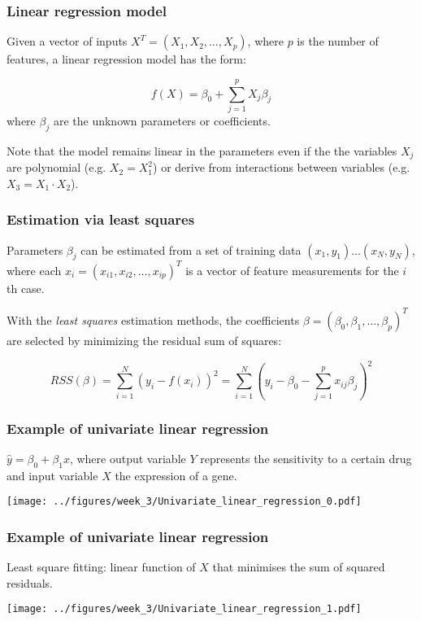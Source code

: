 \documentclass[notes]{beamer}          %
\begin{document}
\begin{frame}
\frametitle{Linear regression model}
Given a vector of inputs $X^T = (X_1, X_2, \dots, X_p)$, where $p$ is the number of features, a linear regression model has the form:

\begin{equation*}
f(X)=\beta_0 + \sum_{j=1}^p X_j\beta_j
\end{equation*}
where $\beta_j$ are the unknown parameters or coefficients. 

\vspace{5mm} 

Note that the model remains linear in the parameters even if the the variables $X_j$ are polynomial (e.g. $X_2 = X_1^2$) or derive from interactions between variables (e.g. $X_3 = X_1 \cdot X_2$).

\end{frame}

\begin{frame}
\frametitle{Estimation via least squares}
Parameters $\beta_j$ can be estimated from a set of training data $(x_1,y_1) \dots (x_N,y_N)$, where each $x_i=(x_{i1}, x_{i2}, \dots, x_{ip})^T$ is a vector of feature measurements for the $i$th case.

\vspace{5mm} 

With the \textit{least squares} estimation methods, the coefficients $\beta=(\beta_0, \beta_1, \dots, \beta_p)^T$ are selected by minimizing the residual sum of squares:

\begin{equation*}
RSS(\beta) = \sum_{i=1}^N (y_i - f(x_i))^2 = \sum_{i=1}^N (y_i - \beta_0 -  \sum_{j=1}^p x_{ij}\beta_j)^2
\end{equation*}
\end{frame}

\begin{frame}
\frametitle{Example of univariate linear regression}
$\hat{y} = \beta_0 + \beta_1 x$, where output variable $Y$ represents the sensitivity to a certain drug and input variable $X$ the expression of a gene.

\begin{center}
\texttt{[image: ../figures/week\_3/Univariate\_linear\_regression\_0.pdf]}
\end{center}

\end{frame}

\begin{frame}
\frametitle{Example of univariate linear regression}
Least square fitting: linear function of $X$ that minimises the sum of squared residuals.

\begin{center}
\texttt{[image: ../figures/week\_3/Univariate\_linear\_regression\_1.pdf]}
\end{center}

\end{frame}
\end{document}
